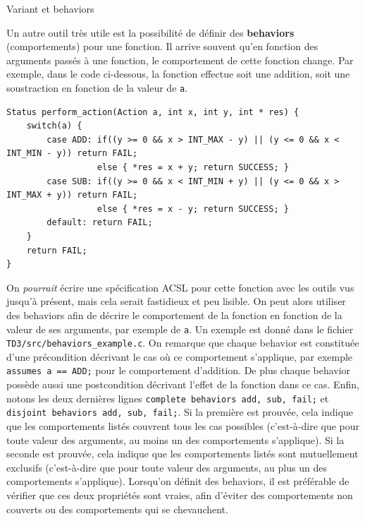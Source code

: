 \documentclass{article}
\begin{document}
\begin{Memo}{Variant et behaviors}{}
    \medskip

    Un autre outil très utile est la possibilité de définir des \textbf{behaviors} (comportements)
    pour une fonction.
    Il arrive souvent qu'en fonction des arguments passés à une fonction,
    le comportement de cette fonction change.
    Par exemple, dans le code ci-dessous, la fonction effectue soit une addition,
    soit une soustraction en fonction de la valeur de \texttt{a}.

    \begin{MeCode}
        \begin{lstlisting}[style=CStyle]
Status perform_action(Action a, int x, int y, int * res) {
    switch(a) {
        case ADD: if((y >= 0 && x > INT_MAX - y) || (y <= 0 && x < INT_MIN - y)) return FAIL; 
                  else { *res = x + y; return SUCCESS; }
        case SUB: if((y >= 0 && x < INT_MIN + y) || (y <= 0 && x > INT_MAX + y)) return FAIL; 
                  else { *res = x - y; return SUCCESS; }
        default: return FAIL;
    }
    return FAIL;
}
        \end{lstlisting}
    \end{MeCode}

    On \textit{pourrait} écrire une spécification ACSL pour cette fonction
    avec les outils vus jusqu'à présent, mais cela serait fastidieux et peu lisible.
    On peut alors utiliser des behaviors afin de décrire le comportement de la fonction
    en fonction de la valeur de ses arguments, par exemple de \texttt{a}.
    Un exemple est donné dans le fichier \texttt{TD3/src/behaviors\_example.c}.
    On remarque que chaque behavior est constituée d'une précondition
    décrivant le cas où ce comportement s'applique, par exemple 
    \texttt{assumes a == ADD;} pour le comportement d'addition.
    De plus chaque behavior possède aussi une postcondition décrivant
    l'effet de la fonction dans ce cas.
    Enfin, notons les deux dernières lignes \texttt{complete behaviors add, sub, fail;} et
    \texttt{disjoint behaviors add, sub, fail;}.
    Si la première est prouvée, cela indique que les comportements 
    listés couvrent tous les cas possibles
    (c'est-à-dire que pour toute valeur des arguments, au moins un des comportements
    s'applique).
    Si la seconde est prouvée, cela indique que les comportements 
    listés sont mutuellement exclusifs
    (c'est-à-dire que pour toute valeur des arguments, au plus un des comportements
    s'applique).
    Lorsqu'on définit des behaviors, il est préférable de vérifier que ces deux 
    propriétés sont vraies, afin d'éviter des comportements non couverts
    ou des comportements qui se chevauchent.


\end{Memo}
\end{document}
